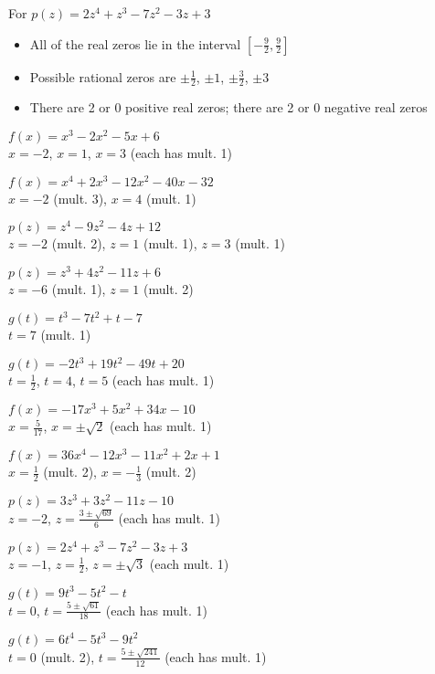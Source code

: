 \begin{exenum}
\item For   $p(z) = 2z^4+z^3-7z^2-3z+3$
\begin{itemize}
\item  All of the real zeros lie in the interval $\left[-\frac{9}{2},\frac{9}{2}\right]$
\item  Possible rational zeros are  $\pm \frac{1}{2}$, $\pm 1$,  $\pm \frac{3}{2}$, $\pm 3$
\item  There are 2 or 0 positive real zeros;  there are 2 or 0 negative real zeros
\end{itemize}


\item $f(x) = x^{3} - 2x^{2} - 5x + 6$ \\ $x = -2$, $x = 1$, $x = 3$ (each has mult. 1)
\item $f(x) = x^{4} + 2x^{3} - 12x^{2} - 40x - 32$ \\ $x = -2$ (mult. 3), $x = 4$ (mult. 1)


\item $p(z) = z^{4} - 9z^{2} - 4z + 12$ \\ $z = -2$ (mult. 2), $z = 1$ (mult. 1), $z = 3$ (mult. 1)
\item $p(z) = z^{3} + 4z^{2} - 11z + 6$ \\ $z = -6$ (mult. 1), $z = 1$ (mult. 2)

\item $g(t) = t^{3} - 7t^{2} + t - 7$ \\ $t = 7$ (mult. 1)
\item $g(t) = -2t^{3} + 19t^{2} - 49t + 20$ \\ $t = \frac{1}{2}$, $t = 4$, $t = 5$ (each has mult. 1)

\item $f(x) = -17x^{3} + 5x^{2} + 34x - 10$ \\ $x = \frac{5}{17}$, $x = \pm \sqrt{2}$ (each has mult. 1)
\item $f(x) = 36x^{4} - 12x^{3} - 11x^{2} + 2x + 1$ \\ $x = \frac{1}{2}$ (mult. 2), $x = -\frac{1}{3}$ (mult. 2)

\item $p(z) = 3z^{3} + 3z^{2} - 11z - 10$ \\ $z = -2$, $z = \frac{3 \pm \sqrt{69}}{6}$ (each has mult. 1)
\item $p(z) = 2z^4+z^3-7z^2-3z+3$ \\ $z = -1$, $z = \frac{1}{2}$, $z=\pm \sqrt{3}$ (each mult. 1)

\item $g(t) = 9t^{3} - 5t^{2} - t$ \\ $t = 0$, $t = \frac{5 \pm \sqrt{61}}{18}$ (each has mult. 1)
\item $g(t) = 6t^{4} - 5t^{3} - 9t^{2}$ \\ $t = 0$ (mult. 2), $t = \frac{5 \pm \sqrt{241}}{12}$ (each has mult. 1)


\end{exenum}

